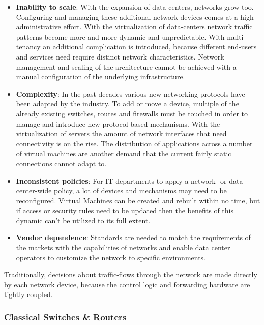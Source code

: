 \begin{itemize}
\item \textbf{Inability to scale}: With the expansion of data centers, networks grow too. Configuring and managing these additional network devices comes at a high administrative effort. With the virtualization of data-centers network traffic patterns become more and more dynamic and unpredictable. With multi-tenancy an additional complication is introduced, because different end-users and services need require distinct network characteristics. Network management and scaling of the architecture cannot be achieved with a manual configuration of the underlying infrastructure.
\item \textbf{Complexity}: In the past decades various new networking protocols have been adapted by the industry. To add or move a device, multiple of the already existing switches, routes and firewalls must be touched in order to manage and introduce new protocol-based mechanisms. With the virtualization of servers the amount of network interfaces that need connectivity is on the rise. The distribution of applications across a number of virtual machines are another demand that the current fairly static connections cannot adapt to.
\item \textbf{Inconsistent policies}: For IT departments to apply a network- or data center-wide policy, a lot of devices and mechanisms may need to be reconfigured. Virtual Machines can be created and rebuilt within no time, but if access or security rules need to be updated then the benefits of this dynamic can't be utilized to its full extent.
\item \textbf{Vendor dependence}: Standards are needed to match the requirements of the markets with the capabilities of networks and enable data center operators to customize the network to specific environments.
\end{itemize}

Traditionally, decisions about traffic-flows through the network are made directly by each network device, because the control logic and forwarding hardware are tightly coupled.

\subsubsection{Classical Switches \& Routers}

